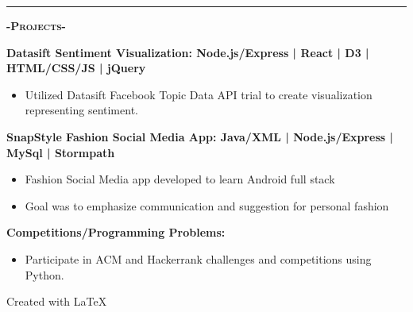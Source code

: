 \documentclass[12pt]{article}
\begin{document}
\noindent\rule{19cm}{0.4pt}

\begin{center}
\textbf{\textsc{-Projects-}}\\
\end{center}
\begin{footnotesize}

\flushleft

\color{Cerulean}\textbf{Datasift Sentiment Visualization: \hfill \color{TealBlue} Node.js/Express | React | D3 | HTML/CSS/JS | jQuery} 
\color{Black}
\begin{itemize}
	\item Utilized Datasift Facebook Topic Data API trial to create visualization representing sentiment.
\end{itemize}
\smallskip
\flushleft
\color{Cerulean}\textbf{SnapStyle Fashion Social Media App: \hfill\color{TealBlue} Java/XML | Node.js/Express | MySql | Stormpath } 
\color{Black}
\begin{itemize}
	\item Fashion Social Media app developed to learn Android full stack
	\item Goal was to emphasize communication and suggestion for personal fashion
\end{itemize}
\smallskip
\setlength\parindent{0pt}
\color{Cerulean}\textbf{Competitions/Programming Problems:}
\color{Black}
\begin{itemize}
	\item Participate in ACM and Hackerrank challenges and competitions using \color{TealBlue}Python.\color{Black}
\end{itemize}
\smallskip

\end{footnotesize}

\center
Created with \LaTeX
\end{document}
